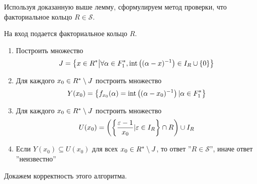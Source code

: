 \documentclass[_00_dissertation.tex]{subfiles}
\begin{document}
Используя доказанную выше лемму, сформулируем метод проверки, что факториальное кольцо $R \in \mathcal{S}$.
\begin{algorithm}\label{algorithm:R_in_S}
    На вход подается факториальное кольцо $R$.
    
    \begin{enumerate}
        \item Построить множество
        \begin{equation*}
            J = \left\{
                x \in R^{*} \big| \forall \alpha \in F_1^{*}, \textrm{int}\left((\alpha - x)^{-1}\right) \in I_{R} \cup \{0\}
            \right\}
        \end{equation*}
        
        \item Для каждого $x_0 \in R^{*} \setminus J$ построить множество
        \begin{equation*}
            Y(x_0) = \left\{
                f_{x_0}(\alpha) = \textrm{int}\left((\alpha - x_0)^{-1}\right) | \alpha \in F_1^{*}
            \right\}
        \end{equation*}
        
        \item Для каждого $x_0 \in R^{*} \setminus J$ построить множество
        \begin{equation*}
            U(x_0) = \left(
                \left\{
                    \frac{\varepsilon - 1}{x_0} | \varepsilon \in I_{R}
                \right\} \cap R
            \right) \cup I_{R}
        \end{equation*}
        
        \item Если $Y(x_0) \subseteq U(x_0)$ для всех $x_0 \in R^{*} \setminus J$, то ответ ''$R \in \mathcal{S}$'', иначе ответ ''неизвестно''
    \end{enumerate}
\end{algorithm}

Докажем корректность этого алгоритма.
\end{document}
